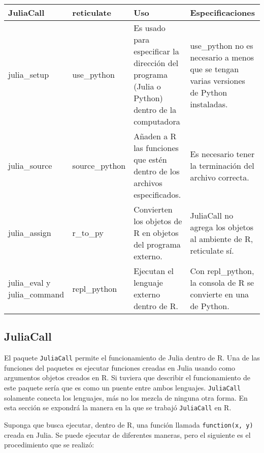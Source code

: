 \begin{center}
	\begin{tabular}{ |p{2.5cm}|p{2.5cm}|p{3cm}|p{3cm}|  }
		\hline
		JuliaCall & reticulate & Uso & Especificaciones\\
		\hline
		julia\_setup   & use\_python    & Es usado para especificar la dirección del programa (Julia o Python) dentro de la computadora &   use\_python no es necesario a menos que se tengan varias versiones de Python instaladas.\\
		\hline
		julia\_source &   source\_python  & Añaden a R las funciones que estén dentro de los archivos especificados.   & Es necesario tener la terminación del archivo correcta.\\
		\hline
		julia\_assign & r\_to\_py &  Convierten los objetos de R en objetos del programa externo. &  JuliaCall no agrega los objetos al ambiente de R, reticulate sí.\\
		\hline
		julia\_eval y julia\_command  & repl\_python\(\) & Ejecutan el lenguaje externo dentro de R. &  Con repl\_python, la consola de R se convierte en una de Python.\\
		\hline
	\end{tabular}
	 \label{comandos_similares}
\end{center}


\subsection{JuliaCall}
El paquete \texttt{JuliaCall} permite el funcionamiento de \textsf{Julia} dentro de \textsf{R}. Una de las funciones del paquetes es ejecutar funciones creadas en \textsf{Julia} usando como argumentos objetos creados en \textsf{R}. Si tuviera que describir el funcionamiento de este paquete sería que es como un puente entre ambos lenguajes. \texttt{JuliaCall} solamente conecta los lenguajes, más no los mezcla de ninguna otra forma. En esta sección se expondrá la manera en la que se trabajó \texttt{JuliaCall} en \textsf{R}. 

Suponga que busca ejecutar, dentro de \textsf{R}, una función llamada \texttt{function(x, y)} creada en \textsf{Julia}. Se puede ejecutar de diferentes maneras, pero el siguiente es el procedimiento que se realizó:

